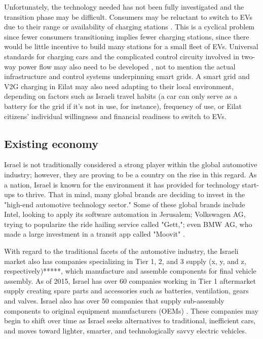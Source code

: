 \documentclass{article}                         %
\begin{document}
Unfortunately, the technology needed has not been fully investigated and the transition phase may be difficult. Consumers may be reluctant to switch to EVs due to their range or availability of charging stations \cite{Zhu2015DistributedGrid}. This is a cyclical problem since fewer consumers transitioning implies fewer charging stations, since there would be little incentive to build many stations for a small fleet of EVs. Universal standards for charging cars and the complicated control circuity involved in two-way power flow may also need to be developed \cite{Ustun2015ImpactSystems, Yeshayahou2011IsraelCharging}, not to mention the actual infrastructure and control systems underpinning smart grids. A smart grid and V2G charging in Eilat may also need adapting to their local environment, depending on factors such as Israeli travel habits (a car can only serve as a battery for the grid if it's not in use, for instance), frequency of use, or Eilat citizens' individual willingness and financial readiness to switch to EVs.

\subsection{Existing economy}
Israel is not traditionally considered a strong player within the global automotive industry; however, they are proving to be a country on the rise in this regard. As a nation, Israel is known for the environment it has provided for technology start-ups to thrive. That in mind, many global brands are deciding to invest in the "high-end automotive technology sector." Some of these global brands include Intel, looking to apply its software automation in Jerusalem; Volkswagen AG, trying to popularize the ride hailing service called "Gett,"; even BMW AG, who made a large investment in a transit app called "Moovit" \cite{Coutinho2018IsraelIndustry}. 

With regard to the traditional facets of the automotive industry, the Israeli market also has companies specializing in Tier 1, 2, and 3 supply (x, y, and z, respectively)*****, which manufacture and assemble components for final vehicle assembly. As of 2015, Israel has over 60 companies working in Tier 1 aftermarket supply creating spare parts and accessories such as batteries, ventilation, gears and valves. Israel also has over 50 companies that supply sub-assembly components to original equipment manufacturers (OEMs) \cite{MinistryofEconomyandIndustryStateofIsraelTheIsrael}. These companies may begin to shift over time as Israel seeks alternatives to traditional, inefficient cars, and moves toward lighter, smarter, and technologically savvy electric vehicles.
\end{document}
